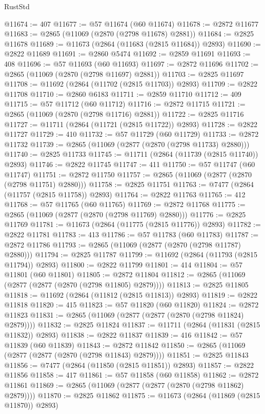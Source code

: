 \begin{lexlean}{RustStd}
\begin{coremodule}
@11674 := 407
@11677 := @57 @11674 (@60 @11674)
@11678 := @2872 @11677
@11683 := @2865 (@11069 (@2870 (@2798 @11678) @2881))
@11684 := @2825 @11678
@11689 := @11673 (@2864 (@11683 (@2815 @11684)) @2893)
@11690 := @2822 @11689
@11691 := @2860 @5474
@11692 := @2859 @11691
@11693 := 408
@11696 := @57 @11693 (@60 @11693)
@11697 := @2872 @11696
@11702 := @2865 (@11069 (@2870 (@2798 @11697) @2881))
@11703 := @2825 @11697
@11708 := @11692 (@2864 (@11702 (@2815 @11703)) @2893)
@11709 := @2822 @11708
@11710 := @2860 @6183
@11711 := @2859 @11710
@11712 := 409
@11715 := @57 @11712 (@60 @11712)
@11716 := @2872 @11715
@11721 := @2865 (@11069 (@2870 (@2798 @11716) @2881))
@11722 := @2825 @11716
@11727 := @11711 (@2864 (@11721 (@2815 @11722)) @2893)
@11728 := @2822 @11727
@11729 := 410
@11732 := @57 @11729 (@60 @11729)
@11733 := @2872 @11732
@11739 := @2865 (@11069 (@2877 (@2870 (@2798 @11733) @2880)))
@11740 := @2825 @11733
@11745 := @11711 (@2864 (@11739 (@2815 @11740)) @2893)
@11746 := @2822 @11745
@11747 := 411
@11750 := @57 @11747 (@60 @11747)
@11751 := @2872 @11750
@11757 := @2865 (@11069 (@2877 (@2870 (@2798 @11751) @2880)))
@11758 := @2825 @11751
@11763 := @7477 (@2864 (@11757 (@2815 @11758)) @2893)
@11764 := @2822 @11763
@11765 := 412
@11768 := @57 @11765 (@60 @11765)
@11769 := @2872 @11768
@11775 := @2865 (@11069 (@2877 (@2870 (@2798 @11769) @2880)))
@11776 := @2825 @11769
@11781 := @11673 (@2864 (@11775 (@2815 @11776)) @2893)
@11782 := @2822 @11781
@11783 := 413
@11786 := @57 @11783 (@60 @11783)
@11787 := @2872 @11786
@11793 := @2865 (@11069 (@2877 (@2870 (@2798 @11787) @2880)))
@11794 := @2825 @11787
@11799 := @11692 (@2864 (@11793 (@2815 @11794)) @2893)
@11800 := @2822 @11799
@11801 := 414
@11804 := @57 @11801 (@60 @11801)
@11805 := @2872 @11804
@11812 := @2865 (@11069 (@2877 (@2877 (@2870 (@2798 @11805) @2879))))
@11813 := @2825 @11805
@11818 := @11692 (@2864 (@11812 (@2815 @11813)) @2893)
@11819 := @2822 @11818
@11820 := 415
@11823 := @57 @11820 (@60 @11820)
@11824 := @2872 @11823
@11831 := @2865 (@11069 (@2877 (@2877 (@2870 (@2798 @11824) @2879))))
@11832 := @2825 @11824
@11837 := @11711 (@2864 (@11831 (@2815 @11832)) @2893)
@11838 := @2822 @11837
@11839 := 416
@11842 := @57 @11839 (@60 @11839)
@11843 := @2872 @11842
@11850 := @2865 (@11069 (@2877 (@2877 (@2870 (@2798 @11843) @2879))))
@11851 := @2825 @11843
@11856 := @7477 (@2864 (@11850 (@2815 @11851)) @2893)
@11857 := @2822 @11856
@11858 := 417
@11861 := @57 @11858 (@60 @11858)
@11862 := @2872 @11861
@11869 := @2865 (@11069 (@2877 (@2877 (@2870 (@2798 @11862) @2879))))
@11870 := @2825 @11862
@11875 := @11673 (@2864 (@11869 (@2815 @11870)) @2893)

\end{coremodule}
\end{lexlean}
